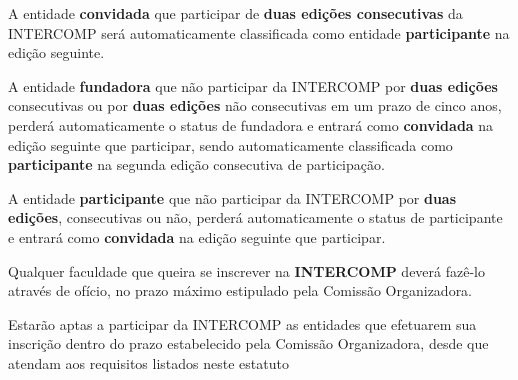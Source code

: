 \begin{article}
	\begin{xparagraph}
		A entidade \textbf{convidada} que participar de \textbf{duas edições consecutivas} da INTERCOMP será automaticamente classificada como entidade \textbf{participante} na edição seguinte.
	\end{xparagraph}

	\begin{xparagraph}
		A entidade \textbf{fundadora} que não participar da INTERCOMP por \textbf{duas edições} consecutivas ou por \textbf{duas edições} não consecutivas em um prazo de cinco anos, perderá automaticamente o status de fundadora e entrará como \textbf{convidada} na edição seguinte que participar, sendo automaticamente classificada como \textbf{participante} na segunda edição consecutiva de participação.
	\end{xparagraph}

	\begin{xparagraph}
		A entidade \textbf{participante} que não participar da INTERCOMP por \textbf{duas edições}, consecutivas ou não, perderá automaticamente o status de participante e entrará como \textbf{convidada} na edição seguinte que participar.
	\end{xparagraph}
\end{article}

\begin{article}
	Qualquer faculdade que queira se inscrever na \textbf{INTERCOMP} deverá fazê-lo através de ofício, no prazo máximo estipulado pela Comissão Organizadora.
\end{article}

\begin{article}
	Estarão aptas a participar da INTERCOMP as entidades que efetuarem sua inscrição dentro do prazo estabelecido pela Comissão Organizadora, desde que atendam aos requisitos listados neste estatuto
\end{article}
